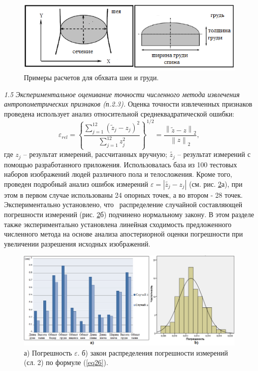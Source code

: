 \begin{figure}[ht!]
\centering
\includegraphics [width=0.8\linewidth] {images/h2.png}
\begin{center}
\caption{Примеры расчетов для обхвата шеи и груди.} \label{img2}
\end{center}
\end{figure}
\textit{1.5 Экспериментальное оценивание точности численного метода извлечения антропометрических признаков (п.2.3).} Оценка точности извлеченных признаков проведена использует анализ относительной среднеквадратической ошибки: 
\begin{equation}\label{eq26}
\varepsilon_{rel}=\left\{\frac{\sum^{12}_{j=1}\left(\widetilde{z}_j - z_j\right)^2}{\sum^{12}_{j=1}z_j^2}\right\}^{1/2} = \frac{\left\|\widetilde{z} -z\right\|_2}{\left\|z\right\|_2},
\end{equation}
где $z_j$ -- результат измерений, рассчитанных вручную; 
$\widetilde{z_j}$ -- результат измерений с помощью разработанного приложения. Использовалась база из 100 тестовых наборов изображений людей различного пола и телосложения. Кроме того, проведен подробный анализ ошибок измерений $\varepsilon = \left|\widetilde{z_j} - z_j\right|$ (см. рис. \ref{img16}а), при этом в первом случае использованы 24 опорных точек, а во втором - 28 точек. Экспериментально установлено, что  распределение случайной составляющей погрешности измерений (рис. \ref{img16}б) подчинено нормальному закону. В этом разделе также экспериментально установлена линейная сходимость предложенного численного метода на основе анализа апостериорной оценки погрешности при увеличении разрешения исходных изображений.
\begin{figure}[ht!]
\centering
\includegraphics [width=0.96\linewidth] {images/h16.png}
\begin{center}
\caption{а) Погрешность $\varepsilon$. б) закон распределения погрешности измерений (сл. 2) по формуле (\ref{eq26}).} \label{img16}
\end{center}
\end{figure}

